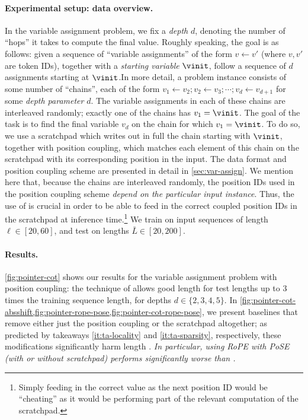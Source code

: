 \documentclass{article}
\newcommand{\arxiv}[1]{\iftoggle{icml}{}{#1}}
\newcommand{\icml}[1]{\iftoggle{icml}{#1}{}}
\begin{document}
\paragraph{Experimental setup: data overview.} In the variable assignment problem, we fix a \emph{depth} $d$, denoting the number of ``hops'' it takes to compute the final value. Roughly speaking, the goal is as follows: given a sequence of ``variable assignments'' of the form $v \gets v'$ (where $v,v'$ are token IDs), together with a \emph{starting variable} $\vinit$, follow a sequence of $d$ assignments starting at $\vinit$.\arxiv{

}In more detail, a problem instance consists of some number of ``chains'', each of the form $v_1 \gets v_2; v_2 \gets v_3 ; \cdots; v_d \gets v_{d+1}$ for some \emph{depth parameter} $d$. The variable assignments in each of these chains are interleaved randomly; exactly one of the chains has $v_1 = \vinit$. The goal of the task is to find the final variable $v_d$ on the chain for which $v_1 = \vinit$. To do so, we use a scratchpad which writes out in full the chain starting with $\vinit$, together with position coupling, which matches each element of this chain on the scratchpad with its corresponding position in the input. The data format and position coupling scheme are presented in detail in \cref{sec:var-assign}. We mention here that, because the chains are interleaved randomly, the position IDs used in the position coupling scheme \emph{depend on the particular input instance}. Thus, the use of \predpc is crucial in order to be able to feed in the correct coupled position IDs in the scratchpad at inference time.\footnote{Simply feeding in the correct value as the next position ID would be ``cheating'' as it would be performing part of the relevant computation of the scratchpad.} We train on input sequences of length $\ell \in [20,60]$, and test on lengths $\bar L \in [20, 200]$.

\paragraph{Results.} \cref{fig:pointer-cot} shows our results for the variable assignment problem with position coupling: the technique of \predpc allows good length \generalization for test lengths up to 3 times the training sequence length, for depths $d \in \{2,3,4,5\}$. In \cref{fig:pointer-cot-absshift,fig:pointer-rope-pose,fig:pointer-cot-rope-pose}\icml{ (\cref{sec:var-assign-results})}, we present baselines that remove either just the position coupling or the scratchpad altogether; as predicted by takeaways \ref{it:ta-locality} and \ref{it:ta-sparsity}, respectively, these modifications significantly harm length \generalization. \emph{In particular, using RoPE with PoSE (with or without scratchpad) performs significantly worse than \PPC.}
\end{document}
